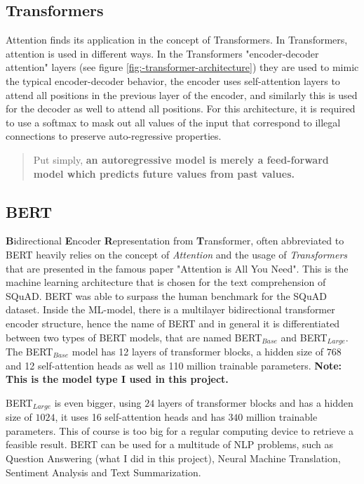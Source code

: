     \subsection{Transformers}
    \label{sec:-transformers}
    
        Attention finds its application in the concept of Transformers. 
        In Transformers, attention is used in different ways.
        In the Transformers "encoder-decoder attention" layers (see figure \ref{fig:-transformer-architecture}) they are used to mimic the typical encoder-decoder behavior, the encoder uses self-attention layers to attend all positions in the previous layer of the encoder, and similarly this is used for the decoder as well to attend all positions.
        For this architecture, it is required to use a softmax to mask out all values of the input that correspond to illegal connections to preserve auto-regressive properties.

        \begin{quote}
            Put simply, \textbf{an autoregressive model is merely a feed-forward model which predicts future values from past values.} \cite{autoregressiveGeorge}
        \end{quote}
    
    
    \subsection{BERT}
    \label{sec:-bert}

        \textbf{B}idirectional \textbf{E}ncoder \textbf{R}epresentation from \textbf{T}ransformer, often abbreviated to BERT heavily relies on the concept of \emph{Attention} and the usage of \emph{Transformers} that are presented in the famous paper "Attention is All You Need"\cite{vaswani2017attention}.
        This is the machine learning architecture that is chosen for the text comprehension of SQuAD.
        BERT was able to surpass the human benchmark for the SQuAD dataset.
        Inside the ML-model, there is a multilayer bidirectional transformer encoder structure, hence the name of BERT and in general it is differentiated between two types of BERT models, that are named BERT$_{Base}$ and BERT$_{Large}$.
        The BERT$_{Base}$ model has 12 layers of transformer blocks, a hidden size of $768$ and 12 self-attention heads as well as 110 million trainable parameters. \textbf{Note: This is the model type I used in this project.}

        BERT$_{Large}$ is even bigger, using $24$ layers of transformer blocks and has a hidden size of $1024$, it uses 16 self-attention heads and has $340$ million trainable parameters. This of course is too big for a regular computing device to retrieve a feasible result.
        BERT can be used for a multitude of NLP problems, such as Question Answering (what I did in this project), Neural Machine Translation, Sentiment Analysis and Text Summarization.
   

